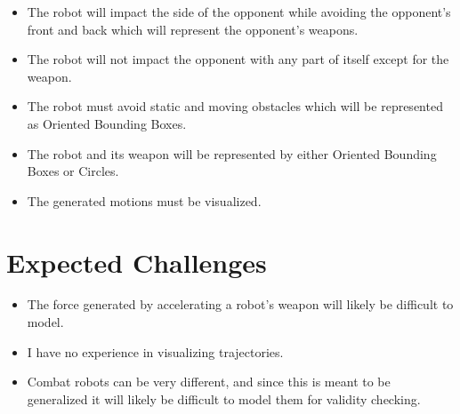 \documentclass[a4 paper]{article}
\begin{document}
\begin{itemize}
	\item The robot will impact the side of the opponent while avoiding the opponent's front and back which will represent the opponent's weapons.
	\item The robot will not impact the opponent with any part of itself except for the weapon.
	\item The robot must avoid static and moving obstacles which will be represented as Oriented Bounding Boxes.
	\item The robot and its weapon will be represented by either Oriented Bounding Boxes or Circles.
	\item The generated motions must be visualized.
\end{itemize}

\section{Expected Challenges}
\begin{itemize}
	\item The force generated by accelerating a robot's weapon will likely be difficult to model.
	\item I have no experience in visualizing trajectories.
	\item Combat robots can be very different, and since this is meant to be generalized it will likely be difficult to model them for validity checking.
\end{itemize}
\end{document}
